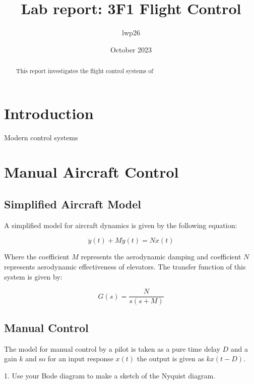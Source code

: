 \documentclass[8pt]{article}
\begin{document}

\title{Lab report: 3F1 Flight Control}
\author{lwp26}
\date{October 2023}
\maketitle

\begin{abstract}
    \centering
    This report investigates the flight control systems of 
\end{abstract}

\section{Introduction}

Modern control systems

\section{Manual Aircraft Control}

\subsection{Simplified Aircraft Model}

A simplified model for aircraft dynamics is given by the following equation:

\[
 \ddot{y}(t) + M\dot{y}(t) = Nx(t)
\]

Where the coefficient $M$ represents the aerodynamic damping and coefficient $N$ represents aerodynamic effectiveness of elevators.
The transfer function of this system is given by:

\begin{equation}
    G(s) = \frac{N}{s(s + M)}
\end{equation}

\subsection{Manual Control}

The model for manual control by a pilot is taken as a pure time delay $D$ and a gain $k$ and so for an input response $x(t)$ the output is given as $kx(t-D)$.


1. Use your Bode diagram to make a sketch of the Nyquist diagram.
\end{document}
